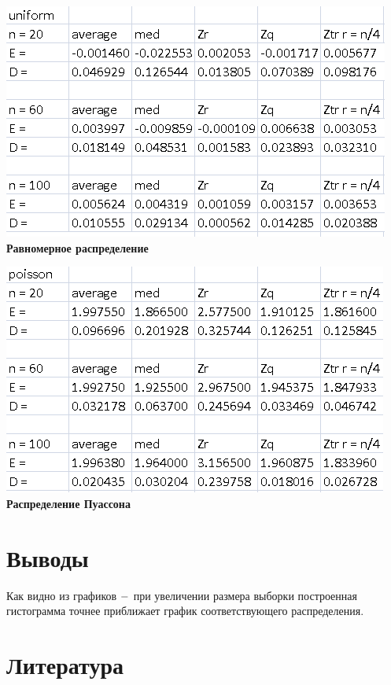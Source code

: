 \documentclass[a4]{article}
\begin{document}
\begin{center}
\includegraphics[width=\textwidth]{uniform.png} \textbf{Равномерное распределение}

\includegraphics[width=\textwidth]{poisson.png} \textbf{Распределение Пуассона}
\end{center}


\section{Выводы}
\par Как видно из графиков $\--$ при увеличении размера выборки построенная гистограмма точнее приближает график соответствующего распределения.



\section{Литература}
 
\end{document}
